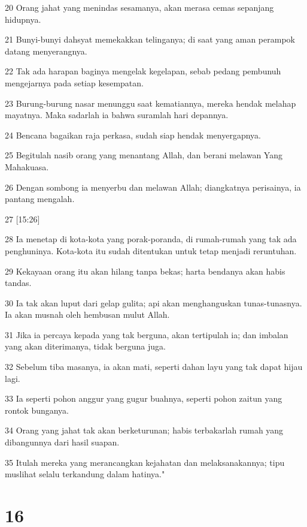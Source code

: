 \par 20 Orang jahat yang menindas sesamanya, akan merasa cemas sepanjang hidupnya.
\par 21 Bunyi-bunyi dahsyat memekakkan telinganya; di saat yang aman perampok datang menyerangnya.
\par 22 Tak ada harapan baginya mengelak kegelapan, sebab pedang pembunuh mengejarnya pada setiap kesempatan.
\par 23 Burung-burung nasar menunggu saat kematiannya, mereka hendak melahap mayatnya. Maka sadarlah ia bahwa suramlah hari depannya.
\par 24 Bencana bagaikan raja perkasa, sudah siap hendak menyergapnya.
\par 25 Begitulah nasib orang yang menantang Allah, dan berani melawan Yang Mahakuasa.
\par 26 Dengan sombong ia menyerbu dan melawan Allah; diangkatnya perisainya, ia pantang mengalah.
\par 27 [15:26]
\par 28 Ia menetap di kota-kota yang porak-poranda, di rumah-rumah yang tak ada penghuninya. Kota-kota itu sudah ditentukan untuk tetap menjadi reruntuhan.
\par 29 Kekayaan orang itu akan hilang tanpa bekas; harta bendanya akan habis tandas.
\par 30 Ia tak akan luput dari gelap gulita; api akan menghanguskan tunas-tunasnya. Ia akan musnah oleh hembusan mulut Allah.
\par 31 Jika ia percaya kepada yang tak berguna, akan tertipulah ia; dan imbalan yang akan diterimanya, tidak berguna juga.
\par 32 Sebelum tiba masanya, ia akan mati, seperti dahan layu yang tak dapat hijau lagi.
\par 33 Ia seperti pohon anggur yang gugur buahnya, seperti pohon zaitun yang rontok bunganya.
\par 34 Orang yang jahat tak akan berketurunan; habis terbakarlah rumah yang dibangunnya dari hasil suapan.
\par 35 Itulah mereka yang merancangkan kejahatan dan melaksanakannya; tipu muslihat selalu terkandung dalam hatinya."

\chapter{16}

